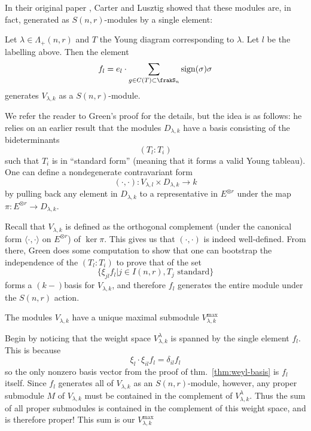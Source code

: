 \documentclass[12pt]{article}
\begin{document}
In their original paper \cite[p.218]{carter-lusztig}, Carter and Lusztig showed that these modules are, in fact, generated as $S(n,r)$-modules by a single element:
\begin{thm}\label{thm:weyl-basis}
	Let $\lambda\in\Lambda_+(n,r)$ and $T$ the Young diagram corresponding to $\lambda$. Let $l$ be the labelling above. Then 
	the element 
	\[f_l=e_l\cdot\sum_{g\in C(T)\subset\frakS_n}\operatorname{sign}(\sigma)\sigma\]
	generates $V_{\lambda,k}$ as a $S(n,r)$-module.
\end{thm}
\begin{prf}[sketch.]
	We refer the reader to Green's \cite[p.46]{green} proof for the details, but the idea is as follows: he relies on an earlier result 
	that the modules $D_{\lambda,k}$ have a basis consisting of the bideterminants 
	\[(T_l:T_i)\]
	such that $T_i$ is in ``standard form'' (meaning that it forms a valid Young tableau). One can define a nondegenerate contravariant form 
	\[(\cdot,\cdot):V_{\lambda,l}\times D_{\lambda,k}\to k\]
	by pulling back any element in $D_{\lambda,k}$ to a representative in $E^{\otimes r}$ under the map $\pi:E^{\otimes r}\to D_{\lambda,k}$.

	Recall that $V_{\lambda,k}$ is defined as the orthogonal complement (under the canonical form $\langle\cdot,\cdot\rangle$ on $E^{\otimes r}$) of $\ker\pi.$
	This gives us that $(\cdot,\cdot)$ is indeed well-defined. From there, Green does some computation to show that one can bootstrap the 
	independence of the $(T_l:T_i)$ to prove that of the set
	\[\{\xi_{jl}f_l|j\in I(n,r), T_j\text{ standard}\}\]
	forms a $(k-)$basis for $V_{\lambda,k}$, and therefore $f_l$ generates the entire module under the $S(n,r)$ action.
\end{prf}
\begin{lem}\label{lem:unique-maximal-submod}
	The modules $V_{\lambda,k}$ have a unique maximal submodule $V_{\lambda,k}^{\text{max}}$
\end{lem}
\begin{prf}
	Begin by noticing that the weight space $V_{\lambda,k}^\lambda$ is spanned by the single element $f_l$. This is because
	\[\xi_l\cdot\xi_{il}f_l=\delta_{il}f_l\]
	so the only nonzero basis vector from the proof of thm.~\ref{thm:weyl-basis} is $f_l$ itself. Since $f_l$ generates 
	all of $V_{\lambda,k}$ as an $S(n,r)$-module, however, any proper submodule $M$ of $V_{\lambda,k}$ must be contained in the 
	complement of $V_{\lambda,k}^\lambda.$ Thus the sum of all proper submodules is contained in the complement of this 
	weight space, and is therefore proper! This sum is our $V_{\lambda,k}^\text{max}$
\end{prf}
\end{document}

